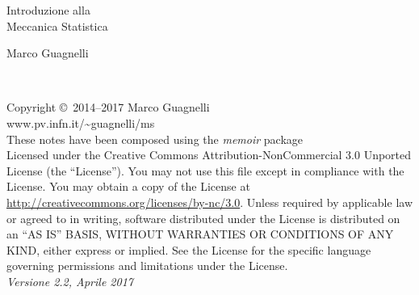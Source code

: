 %
%

\begingroup
\thispagestyle{empty}
{\flushright
  \vspace*{6cm}
  \par\normalfont\fontsize{35}{35}\sffamily\selectfont
  Introduzione alla \\
  \vspace*{16pt}
  Meccanica Statistica\par %
  \vspace*{2cm}
  {\huge Marco Guagnelli}\par %
}
\endgroup


\newpage
~\vfill
\thispagestyle{empty}

\noindent Copyright \copyright\ 2014--2017 Marco Guagnelli\\ %

\noindent www.pv.infn.it/\textasciitilde guagnelli/ms\\ %

\noindent These notes have been composed using the {\em memoir} package\\

\noindent Licensed under the Creative Commons Attribution-NonCommercial 3.0 Unported License (the ``License''). You may not use this file except in compliance with the License. You may obtain a copy of the License at \url{http://creativecommons.org/licenses/by-nc/3.0}. Unless required by applicable law or agreed to in writing, software distributed under the License is distributed on an \textsc{``AS IS'' BASIS, WITHOUT WARRANTIES OR CONDITIONS OF ANY KIND}, either express or implied. See the License for the specific language governing permissions and limitations under the License.\\ %

\noindent \textit{Versione 2.2, Aprile 2017} %
\cleardoublepage


